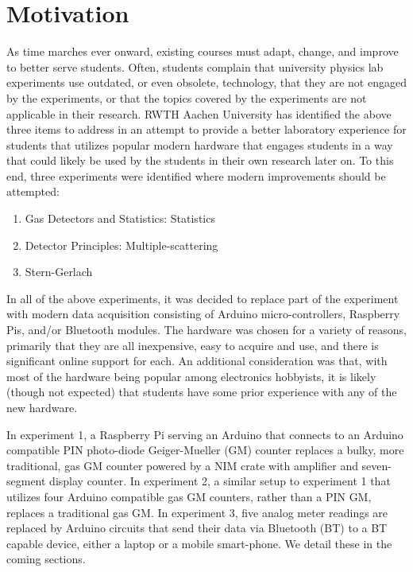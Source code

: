 \section{Motivation}
As time marches ever onward, existing courses must adapt, change, and improve to better serve students.
Often, students complain that university physics lab experiments use outdated, or even obsolete, technology, that they are not engaged by the experiments, or that the topics covered by the experiments are not applicable in their research.
RWTH Aachen University has identified the above three items to address in an attempt to provide a better laboratory experience for students that utilizes popular modern hardware that engages students in a way that could likely be used by the students in their own research later on.
To this end, three experiments were identified where modern improvements should be attempted:
\begin{enumerate}
\item Gas Detectors and Statistics: Statistics
\item Detector Principles: Multiple-scattering
\item Stern-Gerlach
  
\end{enumerate}

In all of the above experiments, it was decided to replace part of the experiment with modern data acquisition consisting of Arduino micro-controllers, Raspberry Pis, and/or Bluetooth modules.
The hardware was chosen for a variety of reasons, primarily that they are all inexpensive, easy to acquire and use, and there is significant online support for each.
An additional consideration was that, with most of the hardware being popular among electronics hobbyists, it is likely (though not expected) that students have some prior experience with any of the new hardware.


In experiment 1, a Raspberry Pi serving an Arduino that connects to an Arduino compatible PIN photo-diode Geiger-Mueller (GM) counter replaces a bulky, more traditional, gas GM counter powered by a NIM crate with amplifier and seven-segment display counter.
In experiment 2, a similar setup to experiment 1 that utilizes four Arduino compatible gas GM counters, rather than a PIN GM, replaces a traditional gas GM.
In experiment 3, five analog meter readings are replaced by Arduino circuits that send their data via Bluetooth (BT) to a BT capable device, either a laptop or a mobile smart-phone.
We detail these in the coming sections.
